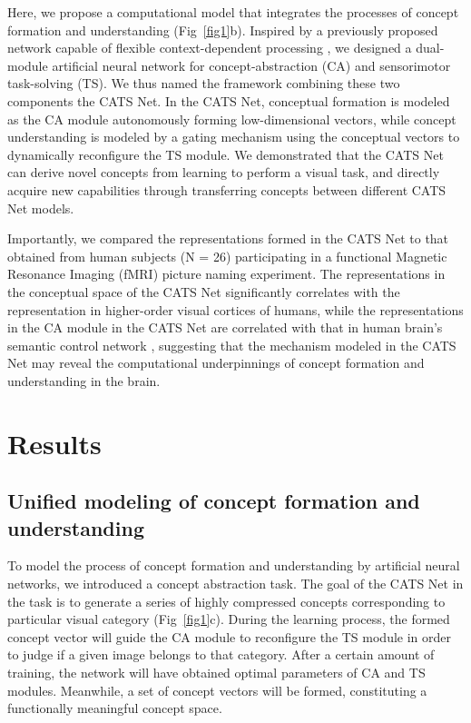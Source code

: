 \documentclass[pdflatex,sn-mathphys-num,lineno]{sn-jnl}%
\begin{document}
\begin{CJK}{UTF8}{gbsn}
Here, we propose a computational model that integrates the processes of concept formation and understanding (Fig~\ref{fig1}b). Inspired by a previously proposed network capable of flexible context-dependent processing \cite{zeng_continual_2019}, we designed a dual-module artificial neural network for concept-abstraction (CA) and sensorimotor task-solving (TS). We thus named the framework combining these two components the CATS Net. In the CATS Net, conceptual formation is modeled as the CA module autonomously forming low-dimensional vectors, while concept understanding is modeled by a gating mechanism using the conceptual vectors to dynamically reconfigure the TS module. We demonstrated that the CATS Net can derive novel concepts from learning to perform a visual task, and directly acquire new capabilities through transferring concepts between different CATS Net models.

Importantly, we compared the representations formed in the CATS Net to that obtained from human subjects (N = 26) participating in a functional Magnetic Resonance Imaging (fMRI) picture naming experiment. The representations in the conceptual space of the CATS Net significantly correlates with the representation in higher-order visual cortices of humans, while the representations in the CA module in the CATS Net are correlated with that in human brain’s semantic control network \cite{jackson_neural_2021}, suggesting that the mechanism modeled in the CATS Net may reveal the computational underpinnings of concept formation and understanding in the brain.

\section{Results}\label{sec_result}
\subsection{Unified modeling of concept formation and understanding}\label{subsec_model_arch}

To model the process of concept formation and understanding by artificial neural networks, we introduced a concept abstraction task. The goal of the CATS Net in the task is to generate a series of highly compressed concepts corresponding to particular visual category (Fig~\ref{fig1}c). During the learning process, the formed concept vector will guide the CA module to reconfigure the TS module in order to judge if a given image belongs to that category. After a certain amount of training, the network will have obtained optimal parameters of CA and TS modules. Meanwhile, a set of concept vectors will be formed, constituting a functionally meaningful concept space. 


\end{CJK}
\end{document}
